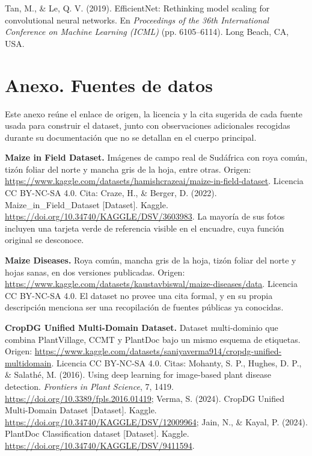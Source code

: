 \documentclass[12pt,letterpaper]{article}
\begin{document}
\par\bigskip
\noindent\hangindent=1.27cm
Tan, M., \& Le, Q. V. (2019). EfficientNet: Rethinking model scaling for convolutional neural networks. En \textit{Proceedings of the 36th International Conference on Machine Learning (ICML)} (pp. 6105--6114). Long Beach, CA, USA.

\newpage

\section*{Anexo. Fuentes de datos}
\label{anexo:datasets}

Este anexo re\'une el enlace de origen, la licencia y la cita sugerida de cada fuente usada para construir el dataset, junto con observaciones adicionales recogidas durante su documentaci\'on que no se detallan en el cuerpo principal.

\textbf{Maize in Field Dataset.} Im\'agenes de campo real de Sud\'africa con roya com\'un, tiz\'on foliar del norte y mancha gris de la hoja, entre otras. Origen: \url{https://www.kaggle.com/datasets/hamishcrazeai/maize-in-field-dataset}. Licencia CC BY-NC-SA 4.0. Cita: Craze, H., \& Berger, D. (2022). Maize\_in\_Field\_Dataset [Dataset]. Kaggle. \url{https://doi.org/10.34740/KAGGLE/DSV/3603983}. La mayor\'ia de sus fotos incluyen una tarjeta verde de referencia visible en el encuadre, cuya funci\'on original se desconoce.

\textbf{Maize Diseases.} Roya com\'un, mancha gris de la hoja, tiz\'on foliar del norte y hojas sanas, en dos versiones publicadas. Origen: \url{https://www.kaggle.com/datasets/kaustavbiswal/maize-diseases/data}. Licencia CC BY-NC-SA 4.0. El dataset no provee una cita formal, y en su propia descripci\'on menciona ser una recopilaci\'on de fuentes p\'ublicas ya conocidas.

\textbf{CropDG Unified Multi-Domain Dataset.} Dataset multi-dominio que combina PlantVillage, CCMT y PlantDoc bajo un mismo esquema de etiquetas. Origen: \url{https://www.kaggle.com/datasets/saniyaverma914/cropdg-unified-multidomain}. Licencia CC BY-NC-SA 4.0. Citas: Mohanty, S. P., Hughes, D. P., \& Salath\'e, M. (2016). Using deep learning for image-based plant disease detection. \textit{Frontiers in Plant Science}, 7, 1419. \url{https://doi.org/10.3389/fpls.2016.01419}; Verma, S. (2024). CropDG Unified Multi-Domain Dataset [Dataset]. Kaggle. \url{https://doi.org/10.34740/KAGGLE/DSV/12009964}; Jain, N., \& Kayal, P. (2024). PlantDoc Classification dataset [Dataset]. Kaggle. \url{https://doi.org/10.34740/KAGGLE/DSV/9411594}.
\end{document}
